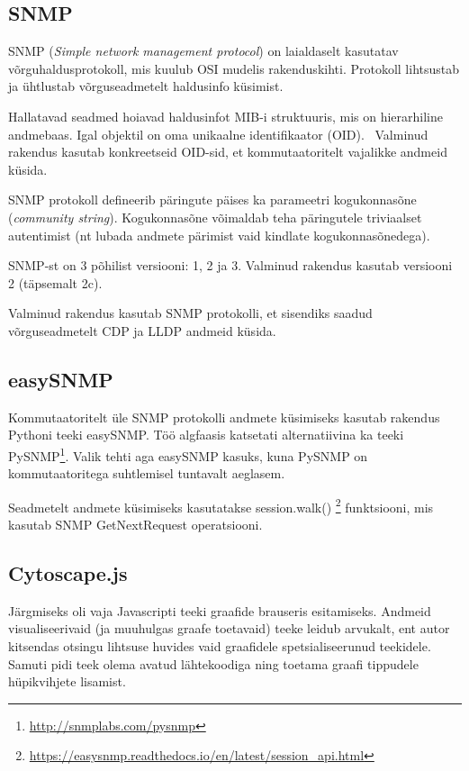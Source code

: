 \documentclass[12pt]{article}
\begin{document}
\subsection{SNMP} \label{subsec:snmp}
SNMP (\textit{Simple network management protocol}) on laialdaselt kasutatav
võrguhaldusprotokoll, mis kuulub OSI mudelis rakenduskihti. Protokoll lihtsustab ja
ühtlustab võrguseadmetelt haldusinfo küsimist.~\cite[151]{sissejuhVorg}

Hallatavad seadmed hoiavad haldusinfot MIB-i struktuuris, mis on hierarhiline andmebaas.
Igal objektil on oma unikaalne identifikaator (OID).~\cite[152]{sissejuhVorg}
Valminud rakendus kasutab konkreetseid OID-sid, et kommutaatoritelt vajalikke andmeid küsida.

SNMP protokoll defineerib päringute päises ka parameetri kogukonnasõne (\textit{community string}).
Kogukonnasõne võimaldab teha päringutele triviaalset autentimist (nt lubada andmete pärimist
vaid kindlate kogukonnasõnedega).~\cite[154-155]{sissejuhVorg}

SNMP-st on 3 põhilist versiooni: 1, 2 ja 3.
Valminud rakendus kasutab versiooni 2 (täpsemalt 2c).

Valminud rakendus kasutab SNMP protokolli, et sisendiks saadud võrguseadmetelt CDP ja LLDP
andmeid küsida.

\subsection{easySNMP} \label{easySNMP}
Kommutaatoritelt üle SNMP protokolli andmete küsimiseks kasutab rakendus Pythoni teeki easySNMP\@.
Töö algfaasis katsetati alternatiivina ka teeki PySNMP\footnote{\url{http://snmplabs.com/pysnmp}}.
Valik tehti aga easySNMP kasuks, kuna PySNMP on kommutaatoritega suhtlemisel tuntavalt aeglasem.
~\cite{easySNMPDocs}

Seadmetelt andmete küsimiseks kasutatakse session.walk()
\footnote{\url{https://easysnmp.readthedocs.io/en/latest/session\_api.html}} funktsiooni, mis
kasutab SNMP GetNextRequest operatsiooni.

\subsection{Cytoscape.js} \label{subsec:cyto}

Järgmiseks oli vaja Javascripti teeki graafide brauseris esitamiseks.
Andmeid visualiseerivaid (ja muuhulgas graafe toetavaid) teeke leidub arvukalt, ent autor kitsendas
otsingu lihtsuse huvides vaid graafidele spetsialiseerunud teekidele.
Samuti pidi teek olema avatud lähtekoodiga ning toetama graafi tippudele hüpikvihjete lisamist.
\end{document}
